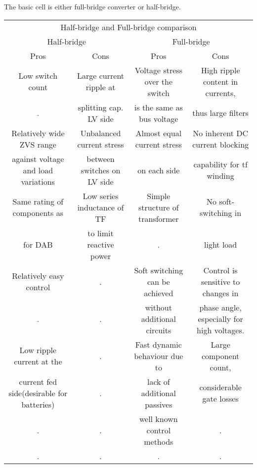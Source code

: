 \documentclass[]{scrartcl}
\begin{document}
The basic cell is either full-bridge converter or half-bridge. 
\begin{table}[h!]
	\centering 
	\begin{adjustbox}{width=1\textwidth}
		\small
		\begin{tabular}{c c c c} 
			\multicolumn{4}{c}{Half-bridge and Full-bridge comparison} \\ 
			\cmidrule(l){1-4}
			\multicolumn{2}{c}{Half-bridge } & \multicolumn{2}{c}{Full-bridge } \\
			Pros  & Cons & Pros & Cons   \\ %
			
			\midrule %
			\midrule
			Low switch count & Large current ripple at  & Voltage stress over the switch & High ripple content in currents, \\ %
			.  & splitting cap. LV side & is the same as bus voltage & thus large filters \\ %
			Relatively wide ZVS range & Unbalanced current stress & Almost equal current stress  & No inherent DC current  blocking\\ %
			against voltage and load variations & between switches on LV side & on each side &  capability for tf winding \\ %
			Same rating of components as & Low series inductance of TF & Simple structure of transformer & No soft-switching in  \\
			for DAB & to limit reactive power & . & light load \\ 
			Relatively easy control & . & Soft switching can be achieved & Control is sensitive to changes in \\
			. & . & without additional circuits & phase angle, especially for high voltages. \\ 
			Low ripple current at the  & . & Fast dynamic behaviour  due to & Large component count, \\
			current fed side(desirable for batteries) & . & lack of additional passives & considerable gate losses \\ 
			. & . & well known control methods  & . \\ %
			. & . & . & . \\ %
			\bottomrule %
		\end{tabular}
	\end{adjustbox}
	\label{tab:template} %
\end{table}
\end{document}
